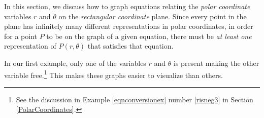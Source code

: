\documentclass{ximera}
\begin{document}
	\author{Stitz-Zeager}




\setcounter{footnote}{0}

\label{PolarGraphs}

In this section, we discuss how to graph equations relating the \textit{polar coordinate} variables $r$ and $\theta$  on the \textit{rectangular coordinate} plane.  Since every point in the plane has infinitely many different representations in polar coordinates, in order for a point $P$ to be on the graph of a given equation,  there must be \textit{at least one} representation of $P(r, \theta)$ that satisfies that equation.  



In our first example,  only one of the variables $r$ and $\theta$ is present making the other variable free.\footnote{See the discussion in Example \ref{eqnconversionex} number \ref{risneg3} in Section \ref{PolarCoordinates}.}  This makes these graphs easier to visualize than others.
\end{document}
